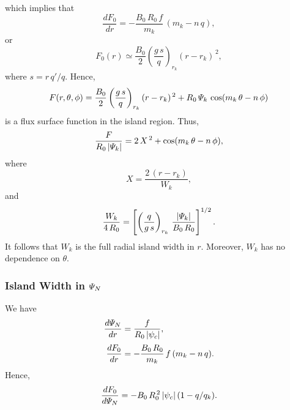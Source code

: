 \documentclass[notitlepage,12pt]{article}
\begin{document}
which implies that
\begin{equation}
\frac{dF_0}{dr} = -\frac{B_0\,R_0\,f}{m_k}\,(m_k-n\,q),
\end{equation}
or
\begin{equation}
F_0(r) \simeq \frac{B_0}{2}\left(\frac{g\,s}{q}\right)_{r_k} (r-r_k)^{\,2},
\end{equation}
where $s=r\,q'/q$. 
Hence,
\begin{equation}
F(r,\theta,\phi) = \frac{B_0}{2}\left(\frac{g\,s}{q}\right)_{r_k}(r-r_k)^{\,2}
+R_0\,{\mit\Psi}_k\,\cos(m_k\,\theta-n\,\phi)
\end{equation}
is a flux surface function in the island region. 
Thus, 
\begin{equation}
\frac{F}{R_0\,|{\mit\Psi}_k|}= 2\,X^{\,2} + \cos(m_k\,\theta-n\,\phi),
\end{equation}
where
\begin{equation}
X = \frac{2\,(r-r_k)}{W_k},
\end{equation}
and
\begin{equation}
\frac{W_k}{4\,R_0} = \left[\left(\frac{q}{g\,s}\right)_{r_k}\,\frac{|{\mit\Psi}_k|}{B_0\,R_0}\right]^{1/2}.
\end{equation}
It follows that $W_k$ is the full radial island width  in $r$. Moreover, $W_k$ has no dependence on $\theta$.

\subsubsection{Island Width in ${\mit\Psi}_N$}
We have
\begin{align}
\frac{d{\mit\Psi}_N}{dr} &= \frac{f}{R_0\,|\psi_c|},\\[0.5ex]
\frac{dF_0}{dr} &= -\frac{B_0\,R_0}{m_k}\,f\,(m_k-n\,q).
\end{align}
Hence,
\begin{equation}
\frac{dF_0}{d{\mit\Psi}_N} = -B_0\,R_0^{\,2}\,|\psi_c|\,(1-q/q_k).
\end{equation}
\end{document}
